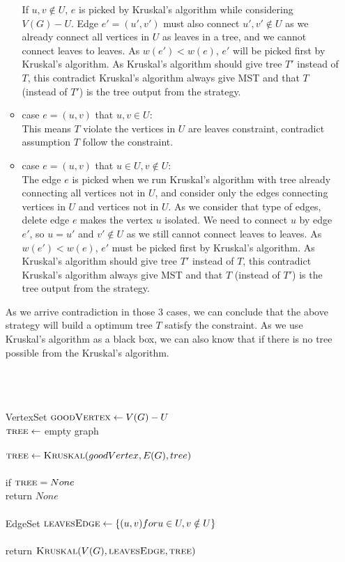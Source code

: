 \documentclass[11pt]{article}
\begin{document}
\begin{itemize}
\begin{itemize}
					If $u,v \notin U$, $e$ is picked by Kruskal's algorithm while considering $V(G)-U$. Edge $e' = (u',v')$ must also connect $u',v' \notin U$ as we already connect all vertices in $U$ as leaves in a tree, and we cannot connect leaves to leaves. As $w(e') < w(e)$, $e'$ will be picked first by Kruskal's algorithm. As Kruskal's algorithm should give tree $T'$ instead of $T$, this contradict Kruskal's algorithm always give MST and that $T$ (instead of $T'$) is the tree output from the strategy. 
			\item	case $e = (u,v)$ that $u,v \in U$:\\
					This means $T$ violate the vertices in $U$ are leaves constraint, contradict assumption $T$ follow the constraint.
			\item	case $e = (u,v)$ that $u \in U, v \notin U$:\\
					The edge $e$ is picked when we run Kruskal's algorithm with tree already connecting all vertices not in $U$, and consider only the edges connecting vertices in $U$ and vertices not in $U$. As we consider that type of edges, delete edge $e$ makes the vertex $u$ isolated. We need to connect $u$ by edge $e'$, so $u=u'$ and $v'\notin U$ as we still cannot connect leaves to leaves. As $w(e') < w(e)$, $e'$ must be picked first by Kruskal's algorithm. As Kruskal's algorithm should give tree $T'$ instead of $T$, this contradict Kruskal's algorithm always give MST and that $T$ (instead of $T'$) is the tree output from the strategy.     
		\end{itemize}
		As we arrive contradiction in those $3$ cases, we can conclude that the above strategy will build a optimum tree $T$ satisfy the constraint. As we use Kruskal's algorithm as a black box, we can also know that if there is no tree possible from the Kruskal's algorithm.
		
\newpage
	 
\begin{algo}
	\+
\\[0.5ex]
\\		
\\		VertexSet $\textsc{goodVertex} \gets V(G)-U$
\\		$\textsc{tree} \gets$ empty graph
\\		
\\		$\textsc{tree} \gets \textsc{Kruskal}(goodVertex, E(G), tree)$
\\		
\\		if $\textsc{tree} = None$\+
\\			return $None$\-
\\
\\		EdgeSet $\textsc{leavesEdge} \gets \{(u,v) for u \in U, v \notin U \}$
\\		
\\		return $\textsc{Kruskal}(V(G), \textsc{leavesEdge}, \textsc{tree})$
\\[0.5ex]
\end{algo}


\end{itemize}
\end{document}
